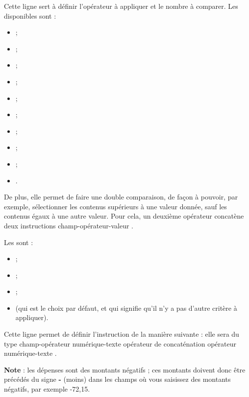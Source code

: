 Cette ligne  sert à définir l'opérateur à appliquer et le nombre à comparer. Les  disponibles sont :

\begin{itemize}
	\item {} ;
	\item{} ;
	\item {} ;
	\item {} ;
	\item{} ;
	\item{} ;
	\item {} ;
	\item {} ;
	\item {} ;
	\item {}.
\end{itemize}

De plus, elle permet de faire une double comparaison, de façon à pouvoir, par exemple, sélectionner les contenus supérieurs à une valeur donnée, sauf les contenus égaux à une autre valeur. Pour cela, un deuxième opérateur concatène deux instructions \og champ-opérateur-valeur \fg{}. 

Les  sont :

\begin{itemize}
	\item {} ;
	\item {} ;
	\item {} ;
	\item {} (qui est le choix par défaut, et qui signifie qu'il n'y a pas d'autre critère à appliquer).
\end{itemize}


Cette ligne permet de définir l'instruction de la manière suivante : elle sera du type \og champ-opérateur numérique-texte \fg{} \og opérateur de concaténation \fg{} \og opérateur numérique-texte \fg{}.


\textbf{Note} : les dépenses sont des montants négatifs  ; ces montants doivent donc être précédés du signe \og \textbf{-} \fg{} (moins) dans les champs où vous saisissez des montants négatifs, par exemple -72,15.

